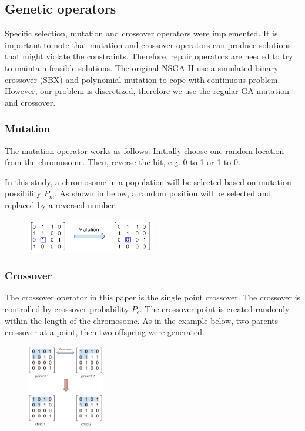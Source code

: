 \documentclass[twoside]{article}
\begin{document}
\subsection{Genetic operators}
\label{sec:operators}
Specific selection, mutation and crossover operators were implemented. It is important to note that mutation and 
crossover operators can produce solutions that might violate the constraints. Therefore, repair 
operators are needed to try to maintain feasible solutions. The original NSGA-II use a simulated 
binary crossover (SBX) \cite{930314} and polynomial mutation \cite{Raghuwanshi04} to cope with continuous problem. 
However, our problem is discretized, therefore we use the regular GA mutation and crossover.


\subsubsection{Mutation}
The mutation operator works as follows: Initially choose one random location from the chromosome. 
Then, reverse the bit, e.g. 0 to 1 or 1 to 0. 

In this study, a chromosome in a population will be selected based on mutation possibility $P_{m}$. 
As shown in below, a random position will be selected and replaced by a reversed number.
\begin{figure}[ht]
\centering
	\includegraphics[width=0.5\textwidth]{pics/mutation.png}
\caption{}
\label{graph1}
\end{figure}
\subsubsection{Crossover}
The crossover operator in this paper is the single point crossover. 
The crossover is controlled by crossover probability $P_{c}$. 
The crossover point is created randomly within the length of the chromosome. 
As in the example below, two parents crossover at a point, then two offspring were generated.
\begin{figure}[ht]
\centering
	\includegraphics[width=0.3\textwidth]{pics/crossover.png}
\caption{}
\label{graph1}
\end{figure}
\end{document}
